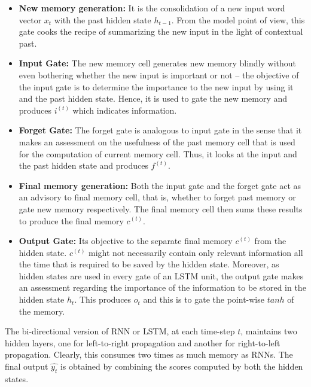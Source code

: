 \begin{itemize}
    \item \textbf{New memory generation: }It is the consolidation of a new input word vector $x_t$ with the past hidden state $h_{t-1}$. From the model point of view, this gate cooks the recipe of summarizing the new input in the light of contextual past.

    \item \textbf{Input Gate: }The new memory cell generates new memory blindly without even bothering whether the new input is important or not -- the objective of the input gate is to determine the importance to the new input by using it and the past hidden state. Hence, it is used to gate the new memory and produces $i^{(t)}$ which indicates information.

    \item \textbf{Forget Gate: }The forget gate is analogous to input gate in the sense that it makes an assessment on the usefulness of the past memory cell that is used for the computation of current memory cell. Thus, it looks at the input and the past hidden state and produces $f^{(t)}$.

    \item \textbf{Final memory generation: }Both the input gate and the forget gate act as an advisory to final memory cell, that is, whether to forget past memory or gate new memory respectively. The final memory cell then sums these results to produce the final memory $c^{(t)}$.

    \item \textbf{Output Gate: } Its objective to the separate final memory $c^{(t)}$ from the hidden state. $c^{(t)}$ might not necessarily contain only relevant information all the time that is required to be saved by the hidden state. Moreover, as hidden states are used in every gate of an LSTM unit, the output gate makes an assessment regarding the importance of the information to be stored in the hidden state $h_t$. This produces $o_t$ and this is to gate the point-wise $tanh$ of the memory.
\end{itemize}

The bi-directional version of RNN or LSTM, at each time-step $t$, maintains two hidden layers, one for left-to-right propagation and another for right-to-left propagation. Clearly, this consumes two times as much memory as RNNs. The final output $\hat{y_t}$ is obtained by combining the scores computed by both the hidden states.


